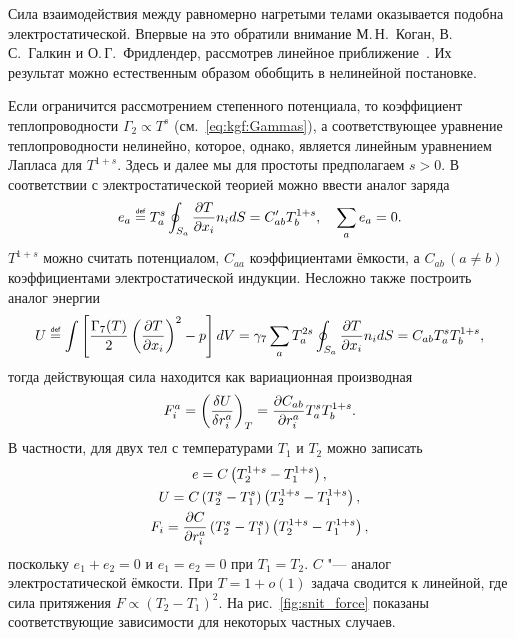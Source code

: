 Сила взаимодействия между равномерно нагретыми телами оказывается подобна электростатической.
Впервые на это обратили внимание М.\,Н.~Коган, В.\,С.~Галкин и О.\,Г.~Фридлендер,
рассмотрев линейное приближение~\cite{Kogan1976}.
Их результат можно естественным образом обобщить в нелинейной постановке.

Если ограничится рассмотрением степенного потенциала,
то коэффициент теплопроводности \(\Gamma_2\propto T^s\) (см.~\eqref{eq:kgf:Gammas}),
а соответствующее уравнение теплопроводности нелинейно,
которое, однако, является линейным уравнением Лапласа для \(T^{1+s}\).
Здесь и далее мы для простоты предполагаем \(s>0\).
В соответствии с электростатической теорией можно ввести аналог заряда
\begin{equation}\label{eq:charge_ell}
    e_a \eqdef T_a^s \oint_{S_a} \pder[T]{x_i}n_i\dd{S} = C'_{ab} T_b^{1+s}, \quad \sum_a e_a = 0.
\end{equation}
\(T^{1+s}\) можно считать потенциалом, \(C_{aa}\) коэффициентами ёмкости,
а \(C_{ab}\,(a\neq b)\) коэффициентами электростатической индукции.
Несложно также построить аналог энергии
\begin{equation}\label{eq:energy_ell}
    U \eqdef \int \left[ \frac{\Gamma_7(T)}2\left(\pder[T]{x_i}\right)^2 - p \right]\dd{V} =
    \gamma_7 \sum_a T_a^{2s} \oint_{S_a} \pder[T]{x_i}n_i\dd{S} =
    C_{ab} T_a^s T_b^{1+s},
\end{equation}
тогда действующая сила находится как вариационная производная
\begin{equation}\label{eq:force_ell}
    F^a_i = \left(\varder[U]{r^a_i}\right)_T = \pder[C_{ab}]{r^a_i} T_a^s T_b^{1+s}.
\end{equation}
В частности, для двух тел с температурами \(T_1\) и \(T_2\) можно записать
\begin{gather}
    e = C \left( T_2^{1+s} - T_1^{1+s} \right), \label{eq:charge_2bodies}\\
    U = C \left( T_2^s - T_1^s \right)\left( T_2^{1+s} - T_1^{1+s} \right), \label{eq:energy_2bodies}\\
    F_i = \pder[C]{r^a_i} \left( T_2^s - T_1^s \right)\left( T_2^{1+s} - T_1^{1+s} \right), \label{eq:force_2bodies}
\end{gather}
поскольку \(e_1+e_2=0\) и \(e_1=e_2=0\) при \(T_1=T_2\). \(C\) "--- аналог электростатической ёмкости.
При \(T=1+o(1)\) задача сводится к линейной, где сила притяжения \(F \propto (T_2-T_1)^2\).
На рис.~\ref{fig:snit_force} показаны соответствующие зависимости для некоторых частных случаев.


